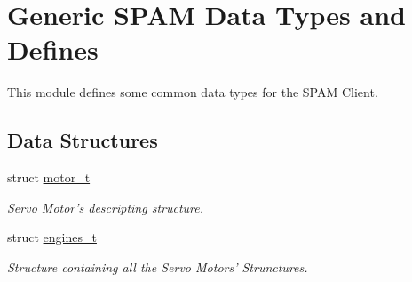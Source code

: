 \hypertarget{group___b_r_o_s_client}{
\section{Generic SPAM Data Types and Defines}
\label{group___b_r_o_s_client}
}


This module defines some common data types for the SPAM Client.  


\subsection*{Data Structures}
\begin{DoxyCompactItemize}
\item 
struct \hyperlink{structmotor__t}{motor\_\-t}
\begin{DoxyCompactList}\small\item\em Servo Motor's descripting structure. \item\end{DoxyCompactList}\item 
struct \hyperlink{structengines__t}{engines\_\-t}
\begin{DoxyCompactList}\small\item\em Structure containing all the Servo Motors' Strunctures. \item\end{DoxyCompactList}\end{DoxyCompactItemize}
